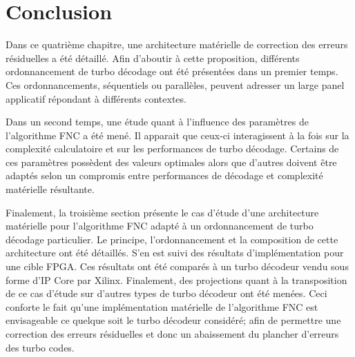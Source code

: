 \begin{table}[!t]
	\centering
	\caption{Récapitulatif des modifications requises par rapport à l'architecture de référence afin de l'adapter à 
	d'autres ordonnancements de turbo décodeurs.}
	\label{tab:fnc_recap}
\end{table}

\section{Conclusion}
Dans ce quatrième chapitre, une architecture matérielle de correction des erreurs résiduelles a été détaillé. 
Afin d'aboutir à cette proposition, différents ordonnancement de turbo décodage ont été présentées dans un premier temps.
Ces ordonnancements, séquentiels ou parallèles, peuvent adresser un large panel applicatif
répondant à différents contextes.

Dans un second temps, une étude quant à l'influence des paramètres de l'algorithme FNC a été mené. Il apparait que 
ceux-ci interagissent à la fois sur la complexité calculatoire et sur les performances de turbo décodage.
Certains de ces paramètres possèdent des valeurs optimales alors que d'autres doivent être adaptés selon un
compromis entre performances de décodage et complexité matérielle résultante.

Finalement, la troisième section présente le cas d'étude d'une architecture matérielle pour l'algorithme FNC adapté à
un ordonnancement de turbo décodage particulier. Le principe, l'ordonnancement et la composition de cette architecture ont 
été détaillés. S'en est suivi des résultats d'implémentation pour une cible FPGA. Ces résultats ont été comparés à un turbo décodeur vendu sous forme d'IP Core par Xilinx. Finalement, des projections quant à la transposition de ce cas d'étude sur d'autres
types de turbo décodeur ont été menées. Ceci conforte le fait qu'une implémentation matérielle de l'algorithme FNC est
envisageable ce quelque soit le turbo décodeur considéré; afin de permettre une correction des erreurs résiduelles et
donc un abaissement du plancher d'erreurs des turbo codes.
